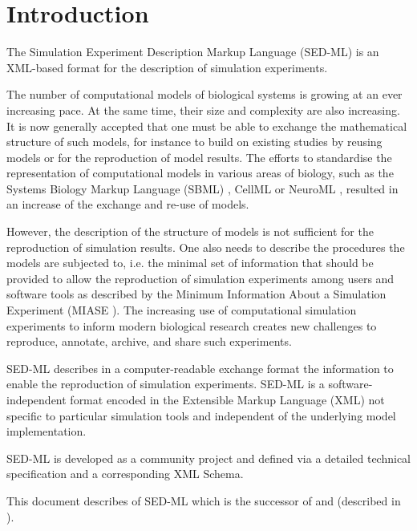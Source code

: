 \chapter{Introduction}
The Simulation Experiment Description Markup Language (SED-ML) is an XML-based format for the description of simulation experiments.

The number of computational models of biological systems is growing at an ever increasing pace. 
At the same time, their size and complexity are also increasing. It is now generally accepted that one must be able to exchange the mathematical structure of such models, for instance to build on existing studies by reusing models or for the reproduction of model results. The efforts to standardise the representation of computational models in various areas of biology, such as the Systems Biology Markup Language (SBML) \citep{Hucka:2003}, CellML \citep{cuellar:2003} or NeuroML \citep{Goddard:2001}, resulted in an increase of the exchange and re-use of models. 

However, the description of the structure of models is not sufficient for the reproduction of simulation results. One also needs to describe the procedures the models are subjected to, i.e. the minimal set of information that should be provided to allow the reproduction of simulation experiments among users and software tools as described by the Minimum Information About a Simulation Experiment (MIASE \citep{Waltemath:2011}). The increasing use of computational simulation experiments to inform modern biological research creates new challenges to reproduce, annotate, archive, and share such experiments. 

SED-ML describes in a computer-readable exchange format the information to enable the reproduction of simulation experiments. SED-ML is a software-independent format encoded in the Extensible Markup Language (XML) \citep{Bray:2006} not specific to particular simulation tools and independent of the underlying model implementation.

SED-ML is developed as a community project and defined via a detailed technical specification and a corresponding XML Schema. 

This document describes \currentLV of SED-ML which is the successor of \previousLV and \LoneVone (described in \citep{WAB+11}).


